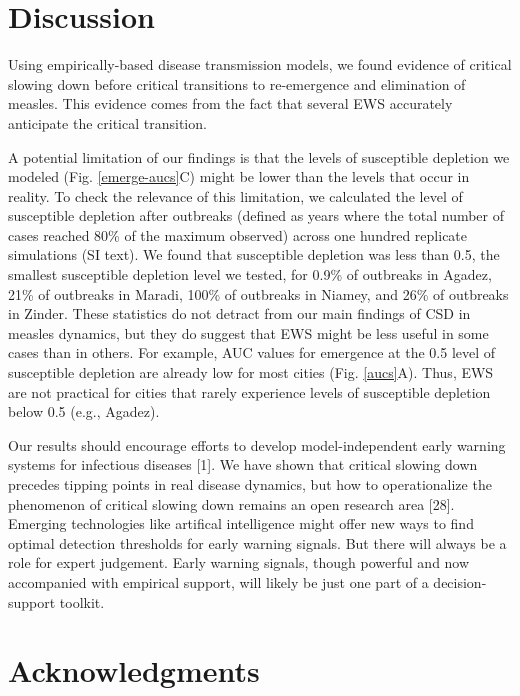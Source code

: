 \documentclass[3p]{elsarticle} %
\begin{document}
\hypertarget{discussion}{%
\section{Discussion}\label{discussion}}

Using empirically-based disease transmission models, we found evidence
of critical slowing down before critical transitions to re-emergence and
elimination of measles. This evidence comes from the fact that several
EWS accurately anticipate the critical transition.

A potential limitation of our findings is that the levels of susceptible
depletion we modeled (Fig. \ref{emerge-aucs}C) might be lower than the
levels that occur in reality. To check the relevance of this limitation,
we calculated the level of susceptible depletion after outbreaks
(defined as years where the total number of cases reached 80\% of the
maximum observed) across one hundred replicate simulations (SI text). We
found that susceptible depletion was less than 0.5, the smallest
susceptible depletion level we tested, for 0.9\% of outbreaks in Agadez,
21\% of outbreaks in Maradi, 100\% of outbreaks in Niamey, and 26\% of
outbreaks in Zinder. These statistics do not detract from our main
findings of CSD in measles dynamics, but they do suggest that EWS might
be less useful in some cases than in others. For example, AUC values for
emergence at the 0.5 level of susceptible depletion are already low for
most cities (Fig. \ref{aucs}A). Thus, EWS are not practical for cities
that rarely experience levels of susceptible depletion below 0.5 (e.g.,
Agadez).

Our results should encourage efforts to develop model-independent early
warning systems for infectious diseases {[}1{]}. We have shown that
critical slowing down precedes tipping points in real disease dynamics,
but how to operationalize the phenomenon of critical slowing down
remains an open research area {[}28{]}. Emerging technologies like
artifical intelligence might offer new ways to find optimal detection
thresholds for early warning signals. But there will always be a role
for expert judgement. Early warning signals, though powerful and now
accompanied with empirical support, will likely be just one part of a
decision-support toolkit.

\hypertarget{acknowledgments}{%
\section{Acknowledgments}\label{acknowledgments}}
\end{document}
